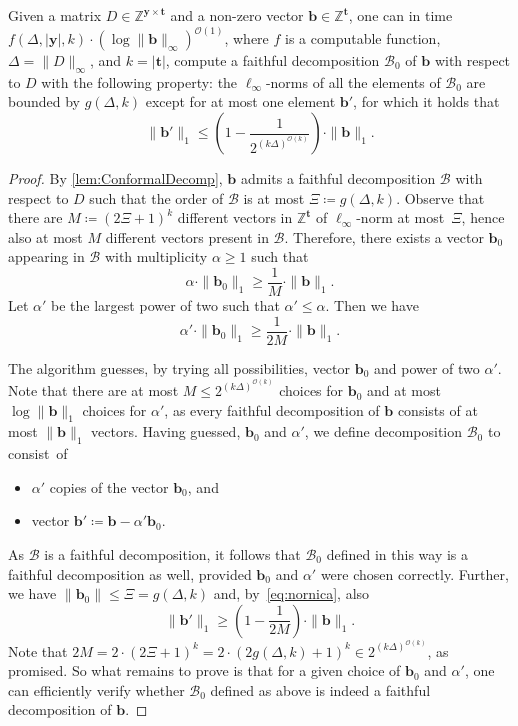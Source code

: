 \documentclass{article}
\renewcommand{\leq}{\leqslant}
\renewcommand{\geq}{\geqslant}
\newcommand{\Bb}{\mathcal{B}}
\newcommand{\Z}{\mathbb{Z}}
\newcommand{\tup}[1]{{\mathbf{#1}}}
\newcommand{\yy}{\tup y}
\newcommand{\tv}{\tup t}
\newcommand{\bb}{\tup b}
\newcommand{\matrices}[3]{#1^{#2\times #3}}
\newcommand{\Oh}{{\mathcal{O}}}
\begin{document}
\begin{lemma}\label{lem:ComputingOneStepDecomp}
Given a matrix $D\in \matrices{\Z}{\yy}{\tv}$ and a non-zero vector $\bb\in \Z^{\tv}$, one can in time $f(\Delta,|\yy|,k)\cdot (\log \|\bb\|_\infty)^{\Oh(1)}$, where $f$ is a computable function, $\Delta=\|D\|_\infty$, and $k=|\tv|$, compute a faithful decomposition $\Bb_0$ of $\bb$ with respect to $D$ with the following property: the $\ell_\infty$-norms of all the elements of $\Bb_0$ are bounded by $g(\Delta,k)$ except for at most one element $\bb'$, for which it holds that
$$\|\bb'\|_1\leq \left(1-\frac{1}{2^{(k\Delta)^{\Oh(k)}}}\right)\cdot \|\bb\|_1.$$
\end{lemma}
\begin{proof}
By \cref{lem:ConformalDecomp}, $\bb$ admits a faithful decomposition $\Bb$ with respect to $D$ such that the order of $\Bb$ is at most $\Xi\coloneqq g(\Delta,k)$. Observe that there are $M\coloneqq (2\Xi+1)^k$ different vectors in $\Z^\tv$ of $\ell_\infty$-norm at most~$\Xi$, hence also at most $M$ different vectors present in $\Bb$. Therefore, there exists a vector $\bb_0$ appearing in $\Bb$ with multiplicity $\alpha\geq 1$ such that
$$\alpha\cdot \|\bb_0\|_1\geq \frac{1}{M}\cdot \|\bb\|_1.$$
Let $\alpha'$ be the largest power of two such that $\alpha'\leq \alpha$. Then we have
\begin{equation}\label{eq:nornica}\alpha'\cdot \|\bb_0\|_1\geq \frac{1}{2M}\cdot \|\bb\|_1.
\end{equation}

The algorithm guesses, by trying all possibilities, vector $\bb_0$ and power of two $\alpha'$. Note that there are at most $M\leq 2^{(k\Delta)^{\Oh(k)}}$ choices for $\bb_0$ and at most $\log \|\bb\|_1$ choices for $\alpha'$, as every faithful decomposition of $\bb$ consists of at most $\|\bb\|_1$ vectors. Having guessed, $\bb_0$ and $\alpha'$, we define decomposition $\Bb_0$ to consist~of
\begin{itemize}[nosep]
    \item $\alpha'$ copies of the vector $\bb_0$, and
    \item vector $\bb'\coloneqq \bb-\alpha'\bb_0$.
\end{itemize}
As $\Bb$ is a faithful decomposition, it follows that $\Bb_0$ defined in this way is a faithful decomposition as well, provided $\bb_0$ and $\alpha'$ were chosen correctly. Further,  we have $\|\bb_0\|\leq \Xi=g(\Delta,k)$ and, by~\cref{eq:nornica}, also
$$\|\bb'\|_1 \geq \left(1-\frac{1}{2M}\right)\cdot \|\bb\|_1.$$
Note that $2M=2\cdot (2\Xi+1)^k=2\cdot (2g(\Delta,k)+1)^k\in 2^{(k\Delta)^{\Oh(k)}}$, as promised.
So what remains to prove is that for a given choice of $\bb_0$ and $\alpha'$, one can efficiently verify whether $\Bb_0$ defined as above is indeed a faithful decomposition of $\bb$.


\end{proof}
\end{document}
